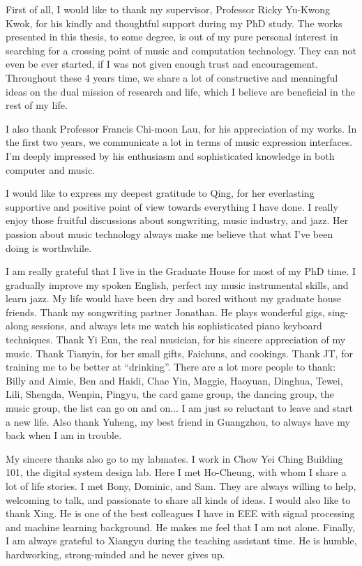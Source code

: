 \begin{acknowledgements}

First of all, I would like to thank my supervisor, Professor Ricky Yu-Kwong Kwok, for his kindly and thoughtful support during my PhD study. The works presented in this thesis, to some degree, is out of my pure personal interest in searching for a crossing point of music and computation technology. They can not even be ever started, if I was not given enough trust and encouragement. Throughout these 4 years time, we share a lot of constructive and meaningful ideas on the dual mission of research and life, which I believe are beneficial in the rest of my life.

I also thank Professor Francis Chi-moon Lau, for his appreciation of my works. In the first two years, we communicate a lot in terms of music expression interfaces. I'm deeply impressed by his enthusiasm and sophisticated knowledge in both computer and music.

I would like to express my deepest gratitude to Qing, for her everlasting supportive and positive point of view towards everything I have done. I really enjoy those fruitful discussions about songwriting, music industry, and jazz. Her passion about music technology always make me believe that what I've been doing is worthwhile.

I am really grateful that I live in the Graduate House for most of my PhD time. I gradually improve my spoken English, perfect my music instrumental skills, and learn jazz. My life would have been dry and bored without my graduate house friends. Thank my songwriting partner Jonathan. He plays wonderful gigs, sing-along sessions, and always lets me watch his sophisticated piano keyboard techniques. Thank Yi Eun, the real musician, for his sincere appreciation of my music. Thank Tianyin, for her small gifts, Faichuns, and cookings. Thank JT, for training me to be better at ``drinking''. There are a lot more people to thank: Billy and Aimie, Ben and Haidi, Chae Yin, Maggie, Haoyuan, Dinghua, Tewei, Lili, Shengda, Wenpin, Pingyu, the card game group, the dancing group, the music group, the list can go on and on... I am just so reluctant to leave and start a new life. Also thank Yuheng, my best friend in Guangzhou, to always have my back when I am in trouble.

My sincere thanks also go to my labmates. I work in Chow Yei Ching Building 101, the digital system design lab. Here I met Ho-Cheung, with whom I share a lot of life stories. I met Bony, Dominic, and Sam. They are always willing to help, welcoming to talk, and passionate to share all kinds of ideas. I would also like to thank Xing. He is one of the best colleagues I have in EEE with signal processing and machine learning background. He makes me feel that I am not alone. Finally, I am always grateful to Xiangyu during the teaching assistant time. He is humble, hardworking, strong-minded and he never gives up.


\end{acknowledgements}
